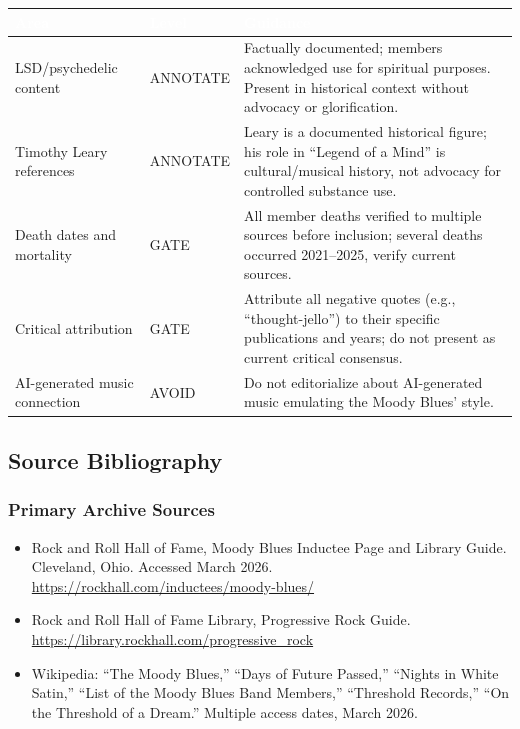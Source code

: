 \documentclass[11pt,letterpaper]{article}
\newcommand{\tableheader}[1]{\textbf{\sffamily\textcolor{white}{#1}}}
\begin{document}
\begin{center}
\begin{tabularx}{\textwidth}{L{3.5cm}L{2cm}X}
\toprule
{}
\tableheader{Area} & \tableheader{Level} & \tableheader{Guidance} \\
\midrule
LSD/psychedelic content & ANNOTATE & Factually documented; members acknowledged use for spiritual purposes. Present in historical context without advocacy or glorification. \\
Timothy Leary references & ANNOTATE & Leary is a documented historical figure; his role in ``Legend of a Mind'' is cultural/musical history, not advocacy for controlled substance use. \\
Death dates and mortality & GATE & All member deaths verified to multiple sources before inclusion; several deaths occurred 2021--2025, verify current sources. \\
Critical attribution & GATE & Attribute all negative quotes (e.g., ``thought-jello'') to their specific publications and years; do not present as current critical consensus. \\
AI-generated music connection & AVOID & Do not editorialize about AI-generated music emulating the Moody Blues' style. \\
\bottomrule
\end{tabularx}
\end{center}

\subsection{Source Bibliography}

\subsubsection{Primary Archive Sources}
\begin{itemize}[leftmargin=*]
  \item Rock and Roll Hall of Fame, Moody Blues Inductee Page and Library Guide. Cleveland, Ohio. Accessed March 2026. \url{https://rockhall.com/inductees/moody-blues/}
  \item Rock and Roll Hall of Fame Library, Progressive Rock Guide. \url{https://library.rockhall.com/progressive_rock}
  \item Wikipedia: ``The Moody Blues,'' ``Days of Future Passed,'' ``Nights in White Satin,'' ``List of the Moody Blues Band Members,'' ``Threshold Records,'' ``On the Threshold of a Dream.'' Multiple access dates, March 2026.
\end{itemize}
\end{document}

